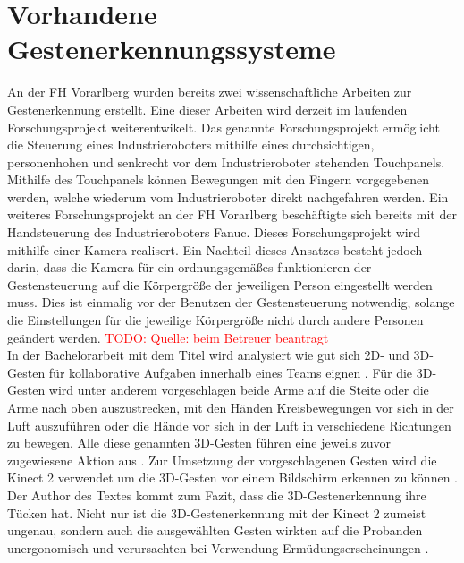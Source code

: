 

\section{Vorhandene Gestenerkennungssysteme}
An der FH Vorarlberg wurden bereits zwei wissenschaftliche Arbeiten zur Gestenerkennung erstellt. Eine dieser Arbeiten wird derzeit im laufenden Forschungsprojekt weiterentwikelt. Das genannte Forschungsprojekt ermöglicht die Steuerung eines Industrieroboters mithilfe eines durchsichtigen, personenhohen und senkrecht vor dem Industrieroboter stehenden Touchpanels. Mithilfe des Touchpanels können Bewegungen mit den Fingern vorgegebenen werden, welche wiederum vom Industrieroboter direkt nachgefahren werden. Ein weiteres Forschungsprojekt an der FH Vorarlberg beschäftigte sich bereits mit der Handsteuerung des Industrieroboters Fanuc. Dieses Forschungsprojekt wird mithilfe einer Kamera realisert. Ein Nachteil dieses Ansatzes besteht jedoch darin, dass die Kamera für ein ordnungsgemäßes funktionieren der Gestensteuerung auf die Körpergröße der jeweiligen Person eingestellt werden muss. Dies ist einmalig vor der Benutzen der Gestensteuerung notwendig, solange die Einstellungen für die jeweilige Körpergröße nicht durch andere Personen geändert werden. \textcolor{red}{TODO: Quelle: beim Betreuer beantragt}\\

In der Bachelorarbeit mit dem Titel  wird analysiert wie gut sich 2D- und 3D-Gesten für kollaborative Aufgaben innerhalb eines Teams eignen \cite[2\psqq]{graczyk_eignungsuntersuchung_nodate}. Für die 3D-Gesten wird unter anderem vorgeschlagen beide Arme auf die Steite oder die Arme nach oben auszustrecken, mit den Händen Kreisbewegungen vor sich in der Luft auszuführen oder die Hände vor sich in der Luft in verschiedene Richtungen zu bewegen. Alle diese genannten 3D-Gesten führen eine jeweils zuvor zugewiesene Aktion aus \cite[39\psqq]{graczyk_eignungsuntersuchung_nodate}. Zur Umsetzung der vorgeschlagenen Gesten wird die Kinect 2 verwendet um die 3D-Gesten vor einem Bildschirm erkennen zu können \cite[33\psqq]{graczyk_eignungsuntersuchung_nodate}. Der Author des Textes kommt zum Fazit, dass die 3D-Gestenerkennung ihre Tücken hat. Nicht nur ist die 3D-Gestenerkennung mit der Kinect 2 zumeist ungenau, sondern auch die ausgewählten Gesten wirkten auf die Probanden unergonomisch und verursachten bei Verwendung Ermüdungserscheinungen \cite[83\psq]{graczyk_eignungsuntersuchung_nodate}.\\

